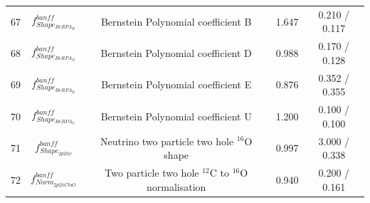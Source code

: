 \begin{tabular} { | c | c | c | c | c |  }
67 & $f_{Shape_{BeRPA_{B}}}^{banff}$ & Bernstein Polynomial coefficient B & 1.647 & 0.210 / 0.117\\ 
68 & $f_{Shape_{BeRPA_{D}}}^{banff}$ & Bernstein Polynomial coefficient D & 0.988 & 0.170 / 0.128\\ 
69 & $f_{Shape_{BeRPA_{E}}}^{banff}$ & Bernstein Polynomial coefficient E & 0.876 & 0.352 / 0.355\\ 
70 & $f_{Shape_{BeRPA_{U}}}^{banff}$ & Bernstein Polynomial coefficient U & 1.200 & 0.100 / 0.100\\ 
71 & $f_{Shape_{2p2h\nu}}^{banff}$ & Neutrino two particle two hole $^{16}$O shape & 0.997 & 3.000 / 0.338\\ 
72 & $f_{Norm_{2p2h C to O}}^{banff}$ & Two particle two hole $^{12}$C to $^{16}$O normalisation & 0.940 & 0.200 / 0.161\\ 

\hline

\end{tabular}
